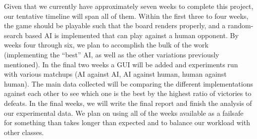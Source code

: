 \documentclass{article}
\begin{document}
Given that we currently have approximately seven weeks to complete this project, our tentative timeline will span all of them.
Within the first three to four weeks, the game should be playable such that the board renders properly, and a random-search based AI is implemented that can play against a human opponent.
By weeks four through six, we plan to accomplish the bulk of the work (implementing the “best” AI, as well as the other variations previously mentioned).
In the final two weeks a GUI will be added and experiments run with various matchups (AI against AI, AI against human, human against human).
The main data collected will be comparing the different implementations against each other to see which one is the best by the highest ratio of victories to defeats.
In the final weeks, we will write the final report and finish the analysis of our experimental data.
We plan on using all of the weeks available as a failsafe for something than takes longer than expected and to balance our workload with other classes.

   \medskip
   \nocite{*}
   
   
\end{document}

